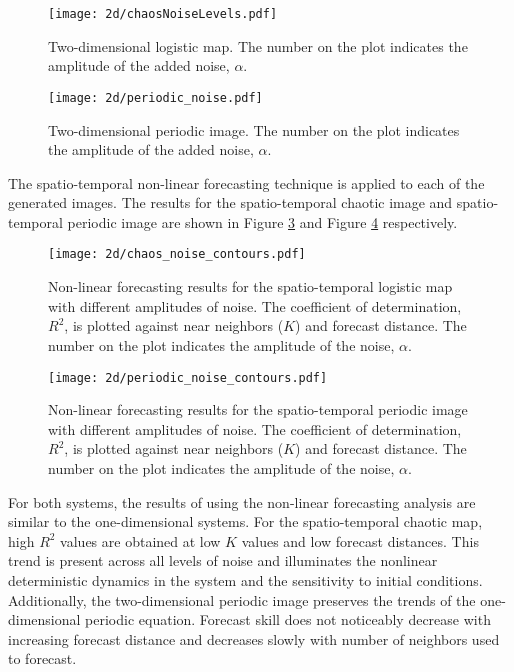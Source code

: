 \begin{figure}[htbp]  %
   \centering
   \texttt{[image: 2d/chaosNoiseLevels.pdf]} 
   \caption{Two-dimensional logistic map. The number on the plot indicates the amplitude of the added noise, $\alpha$. }
   \label{spatial_logistic}
\end{figure}

\begin{figure}[htbp]  %
   \centering
   \texttt{[image: 2d/periodic\_noise.pdf]} 
   \caption{Two-dimensional periodic image. The number on the plot indicates the amplitude of the added noise, $\alpha$.}
   \label{spatial_periodic}
\end{figure}


The spatio-temporal non-linear forecasting technique is applied to each of the generated images. The results for the spatio-temporal chaotic image and spatio-temporal periodic image are shown in Figure \ref{spatial_logistic_contour} and Figure \ref{spatial_periodic_contour} respectively.


\begin{figure}[htbp]  %
   \centering
   \texttt{[image: 2d/chaos\_noise\_contours.pdf]} 
   \caption{Non-linear forecasting results for the spatio-temporal logistic map with different amplitudes of noise. The coefficient of determination, $R^2$, is plotted against near neighbors ($K$) and forecast distance. The number on the plot indicates the amplitude of the noise, $\alpha$.}
   \label{spatial_logistic_contour}
\end{figure}

\begin{figure}[htbp]  %
   \centering
   \texttt{[image: 2d/periodic\_noise\_contours.pdf]} 
   \caption{Non-linear forecasting results for the spatio-temporal periodic image with different amplitudes of noise. The coefficient of determination, $R^2$, is plotted against near neighbors ($K$) and forecast distance. The number on the plot indicates the amplitude of the noise, $\alpha$.}
   \label{spatial_periodic_contour}
\end{figure}

For both systems, the results of using the non-linear forecasting analysis are similar to the one-dimensional systems. For the spatio-temporal chaotic map, high $R^2$ values are obtained at low $K$ values and low forecast distances. This trend is present across all levels of noise and illuminates the nonlinear deterministic dynamics in the system and the sensitivity to initial conditions. Additionally, the two-dimensional periodic image preserves the trends of the one-dimensional periodic equation. Forecast skill does not noticeably decrease with increasing forecast distance and decreases slowly with number of neighbors used to forecast.

